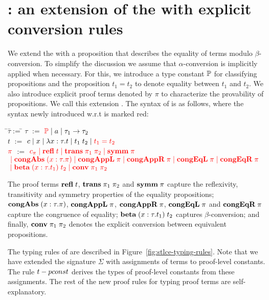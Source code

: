 \documentclass[10pt]{article}
\begin{document}
\section{\STLCE: an extension of the \STLC with explicit conversion rules}
%
We extend the \STLC with a proposition that describes the equality of
terms modulo $\beta$-conversion. To simplify the discussion we assume
that $\alpha$-conversion is implicitly applied when necessary. For
this, we introduce a type constant $\mathbb{P}$ for classifying
propositions and the proposition $t_1 = t_2$ to denote equality
between $t_1$ and $t_2$. We also introduce explicit proof terms
denoted by $\pi$ to characterize the provability of propositions. We
call this extension \STLCE. The syntax of \STLCE is as follows, where the
syntax newly introduced w.r.t \STLC is marked red:
%
\begin{tabbing}
\qquad\=$\tau$\quad\=$:=$\quad\=\kill
\>$\tau$  \>$:=$  \>$\textcolor{red}{\mathbb{P}} \; | \; a \; | \; \tau_1 \to \tau_2$\\
\>$t$     \>$:=$  \>$c \; | \; x \; | \; \lambda{x}:{\tau}.{t} \; | \; t_1\; t_2 \; | \; \textcolor{red}{t_1 = t_2}$\\
\>$\textcolor{red}{\pi}$   \>$:=$  \>$\textcolor{red}{c_\pi \; | \; \mbox{\bf refl}\; t \; | \; \mbox{\bf trans}\;\pi_1\; \pi_2 \; | \; \mbox{\bf symm}\; \pi}$\\
\>\>\>$\textcolor{red}{\; | \; \mbox{\bf congAbs}\;(x:\tau.\pi) \; | \; \mbox{\bf congAppL}\;\pi \; | \; \mbox{\bf congAppR}\;\pi 
       \; | \; \mbox{\bf congEqL}\;\pi \; | \; \mbox{\bf congEqR}\;\pi}$\\
\>\>\>$\textcolor{red}{\; | \; \mbox{\bf beta}\;(x:\tau.t_1)\; t_2 \; | \; \mbox{\bf conv}\; \pi_1\; \pi_2}$
\end{tabbing}
%
The proof terms $\mbox{\bf refl}\; t$, $\mbox{\bf trans}\;\pi_1\; \pi_2$ and $\mbox{\bf symm}\; \pi$
capture the reflexivity, transitivity and symmetry properties of the
equality propositions; $\mbox{\bf congAbs}\;(x:\tau.\pi)$, $\mbox{\bf congAppL}\;\pi$,
$\mbox{\bf congAppR}\;\pi$, $\mbox{\bf congEqL}\;\pi$ and $\mbox{\bf congEqR}\;\pi$ capture the
congruence of equality; $\mbox{\bf beta}\;(x:\tau.t_1)\; t_2$ captures
$\beta$-conversion; and finally, $\mbox{\bf conv}\; \pi_1\; \pi_2$ denotes the
explicit conversion between equivalent propositions.

The typing rules of \STLCE are described in Figure~\ref{fig:stlce-typing-rules}.
Note that we have extended the signature $\Sigma$ with assignments of
terms to proof-level constants. The rule $t-pconst$ derives the
types of proof-level constants from these assignments. The rest of the new
proof rules for typing proof terms are self-explanatory.
\end{document}
